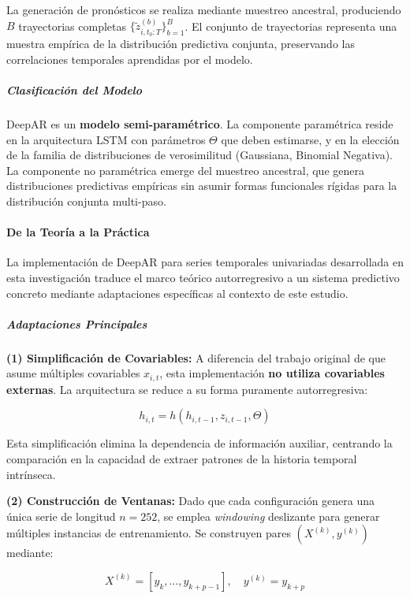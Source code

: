 La generación de pronósticos se realiza mediante muestreo ancestral, produciendo $B$ trayectorias completas $\{\tilde{z}_{i,t_0:T}^{(b)}\}_{b=1}^{B}$. El conjunto de trayectorias representa una muestra empírica de la distribución predictiva conjunta, preservando las correlaciones temporales aprendidas por el modelo.

\subparagraph{Clasificación del Modelo}

DeepAR es un \textbf{modelo semi-paramétrico}. La componente paramétrica reside en la arquitectura LSTM con parámetros $\Theta$ que deben estimarse, y en la elección de la familia de distribuciones de verosimilitud (Gaussiana, Binomial Negativa). La componente no paramétrica emerge del muestreo ancestral, que genera distribuciones predictivas empíricas sin asumir formas funcionales rígidas para la distribución conjunta multi-paso.

\paragraph{De la Teoría a la Práctica}

La implementación de DeepAR para series temporales univariadas desarrollada en esta investigación traduce el marco teórico autorregresivo a un sistema predictivo concreto mediante adaptaciones específicas al contexto de este estudio.

\subparagraph{Adaptaciones Principales}

\textbf{(1) Simplificación de Covariables:} A diferencia del trabajo original de \textcite{Salinas2020} que asume múltiples covariables $x_{i,t}$, esta implementación \textbf{no utiliza covariables externas}. La arquitectura se reduce a su forma puramente autorregresiva:

\begin{equation}
h_{i,t} = h(h_{i,t-1}, z_{i,t-1}, \Theta)
\end{equation}

Esta simplificación elimina la dependencia de información auxiliar, centrando la comparación en la capacidad de extraer patrones de la historia temporal intrínseca.

\textbf{(2) Construcción de Ventanas:} Dado que cada configuración genera una única serie de longitud $n=252$, se emplea \textit{windowing} deslizante para generar múltiples instancias de entrenamiento. Se construyen pares $(X^{(k)}, y^{(k)})$ mediante:

\begin{equation}
X^{(k)} = [y_k, \ldots, y_{k+p-1}], \quad y^{(k)} = y_{k+p}
\end{equation}

